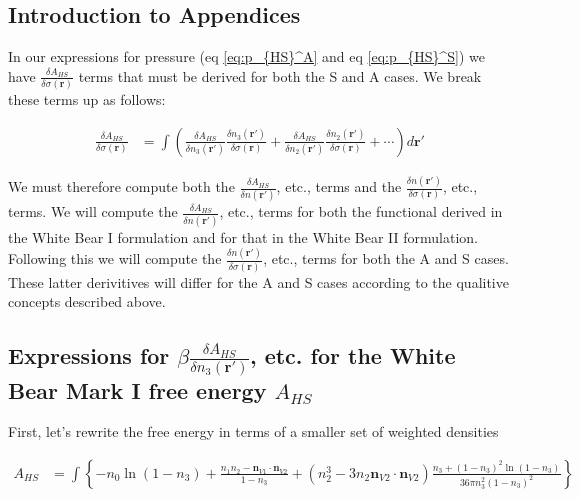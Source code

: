 \documentclass[letterpaper,twocolumn,amsmath,amssymb,jcp,10pt,aip]{revtex4-1}
\begin{document}
\begin{widetext}

\section*{Introduction to Appendices}

In our expressions for pressure (eq \ref{eq:p_{HS}^A} and eq \ref{eq:p_{HS}^S}) we have $\frac{\delta A_{HS}}{\delta \sigma(\mathbf{r})}$ terms that must be derived for both the S and A cases.  We break these terms up as follows:

  \begin{align}
    \frac{\delta A_{HS}}{\delta \sigma(\mathbf{r})} &=
    \int \left(
    \frac{\delta A_{HS}}{\delta n_3(\mathbf{r}')}
    \frac{\delta n_3(\mathbf{r}')}{\delta \sigma(\mathbf{r})}
    +
    \frac{\delta A_{HS}}{\delta n_2(\mathbf{r}')}
    \frac{\delta n_2(\mathbf{r}')}{\delta \sigma(\mathbf{r})}
    + \cdots
    \right) d\mathbf{r}'
  \end{align}


We must therefore compute both the $\frac{\delta A_{HS}}{\delta n(\mathbf{r}')}$, etc., terms and the $\frac{\delta n(\mathbf{r}')}{\delta \sigma(\mathbf{r})}$, etc., terms.  We will compute the $\frac{\delta A_{HS}}{\delta n(\mathbf{r}')}$, etc., terms for both the functional derived in the White Bear I formulation and for that in the White Bear II formulation.  Following this we will compute the $\frac{\delta n(\mathbf{r}')}{\delta \sigma(\mathbf{r})}$, etc., terms for both the A and S cases.  These latter derivitives will differ for the A and S cases according to the qualitive concepts described above.

\subsection{Expressions for $\beta\frac{\delta A_{HS}}{\delta n_3(\mathbf{r}')}$, etc. for the White Bear Mark I free energy $A_{HS}$}

  First, let's rewrite the free energy in terms of a smaller set of weighted densities

  \begin{align}
    A_{HS} &= \int \left\{
    -n_0 \ln\left( 1 - n_3\right)
    + \frac{n_1 n_2 - \mathbf{n}_{V1} \cdot\mathbf{n}_{V2}}{1-n_3}
    + (n_2^3 - 3 n_2 \mathbf{n}_{V2} \cdot \mathbf{n}_{V2}) \frac{
      n_3 + (1-n_3)^2 \ln(1-n_3)
    }{
      36\pi n_3^2(1-n_3)^2
    }
    \right\}
  \end{align}


\end{widetext}
\end{document}
